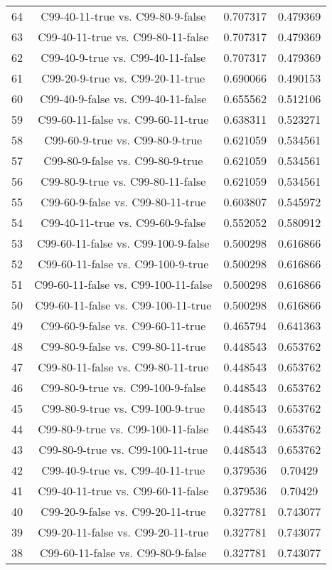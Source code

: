 \documentclass[a4paper,10pt]{article}
\begin{document}
\begin{landscape}
\begin{table}[!htp]
\begin{tabular}{cccc}
64&C99-40-11-true vs. C99-80-9-false&0.707317&0.479369\\
63&C99-40-11-true vs. C99-80-11-false&0.707317&0.479369\\
62&C99-40-9-true vs. C99-40-11-false&0.707317&0.479369\\
61&C99-20-9-true vs. C99-20-11-true&0.690066&0.490153\\
60&C99-40-9-false vs. C99-40-11-false&0.655562&0.512106\\
59&C99-60-11-false vs. C99-60-11-true&0.638311&0.523271\\
58&C99-60-9-true vs. C99-80-9-true&0.621059&0.534561\\
57&C99-80-9-false vs. C99-80-9-true&0.621059&0.534561\\
56&C99-80-9-true vs. C99-80-11-false&0.621059&0.534561\\
55&C99-60-9-false vs. C99-80-11-true&0.603807&0.545972\\
54&C99-40-11-true vs. C99-60-9-false&0.552052&0.580912\\
53&C99-60-11-false vs. C99-100-9-false&0.500298&0.616866\\
52&C99-60-11-false vs. C99-100-9-true&0.500298&0.616866\\
51&C99-60-11-false vs. C99-100-11-false&0.500298&0.616866\\
50&C99-60-11-false vs. C99-100-11-true&0.500298&0.616866\\
49&C99-60-9-false vs. C99-60-11-true&0.465794&0.641363\\
48&C99-80-9-false vs. C99-80-11-true&0.448543&0.653762\\
47&C99-80-11-false vs. C99-80-11-true&0.448543&0.653762\\
46&C99-80-9-true vs. C99-100-9-false&0.448543&0.653762\\
45&C99-80-9-true vs. C99-100-9-true&0.448543&0.653762\\
44&C99-80-9-true vs. C99-100-11-false&0.448543&0.653762\\
43&C99-80-9-true vs. C99-100-11-true&0.448543&0.653762\\
42&C99-40-9-true vs. C99-40-11-true&0.379536&0.70429\\
41&C99-40-11-true vs. C99-60-11-false&0.379536&0.70429\\
40&C99-20-9-false vs. C99-20-11-true&0.327781&0.743077\\
39&C99-20-11-false vs. C99-20-11-true&0.327781&0.743077\\
38&C99-60-11-false vs. C99-80-9-false&0.327781&0.743077\\

\end{tabular}
\end{table}
\end{landscape}
\end{document}
